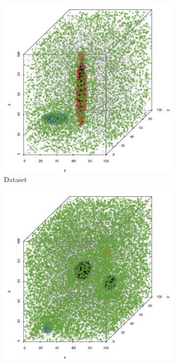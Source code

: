 \begin{figure}
\begin{subfigure}{0.23\textwidth}
			\includegraphics[keepaspectratio=true, width=\textwidth, height=0.23\textheight]{discussion/img/baakman_2_60000_anisotropy.png}
			\caption{Dataset \baakmanTwo}
			\label{fig:discussion:anisotropy:baakman2}
		\end{subfigure}	
		\begin{subfigure}{0.23\textwidth}
			\centering
			\includegraphics[keepaspectratio=true, width=\textwidth, height=0.23\textheight]{discussion/img/ferdosi_3_120000_anisotropy.png}

\end{subfigure}
\end{figure}
